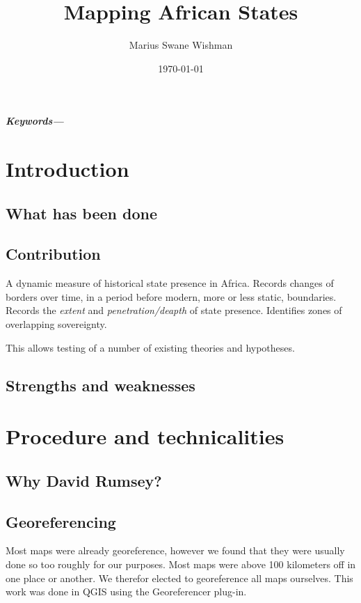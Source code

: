 \documentclass[12pt]{article}
\title{Mapping African States}
\author[1]{Marius Swane Wishman}
\affil[1]{Department of Sociology and Political Science, NTNU}
\date{\today}
\providecommand{\keywords}[1]
{
	\small	
	\textbf{\textit{Keywords---}} #1
}
\begin{document}
\maketitle

\begin{abstract}
\end{abstract}

\keywords{}

\pagebreak


\onehalfspacing

\section{Introduction}
\subsection{What has been done}
\subsection{Contribution}

A dynamic measure of historical state presence in Africa.
Records changes of borders over time, in a period before modern, more or less static, boundaries.
Records the \emph{extent} and \emph{penetration/deapth} of state presence.
Identifies zones of overlapping sovereignty.

This allows testing of a number of existing theories and hypotheses.

\subsection{Strengths and weaknesses}

\section{Procedure and technicalities}
\subsection{Why David Rumsey?}
\subsection{Georeferencing}

Most maps were already georeference, however we found that they were usually
done so too roughly for our purposes. Most maps were above 100 kilometers off in
one place or another. We therefor elected to georeference all maps ourselves.
This work was done in QGIS using the Georeferencer plug-in.
\end{document}
